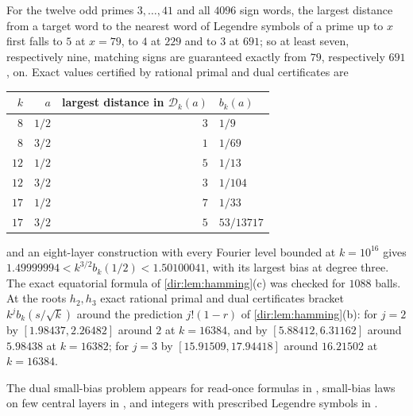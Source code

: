 \begin{example}\label{dir:ex:signs}
For the twelve odd primes $3,\dots,41$ and all $4096$ sign words, the largest distance from a
target word to the nearest word of Legendre symbols of a prime up to $x$ first falls to $5$ at
$x=79$, to $4$ at $229$ and to $3$ at $691$; so at least seven, respectively nine, matching signs
are guaranteed exactly from $79$, respectively $691$, on. Exact values certified by rational
primal and dual certificates are
\begin{center}\small
\begin{tabular}{rrrl}
\toprule
$k$ & $a$ & largest distance in $\mathcal D_k(a)$ & $b_k(a)$\\
\midrule
$8$ & $1/2$ & $3$ & $1/9$\\
$8$ & $3/2$ & $1$ & $1/69$\\
$12$ & $1/2$ & $5$ & $1/13$\\
$12$ & $3/2$ & $3$ & $1/104$\\
$17$ & $1/2$ & $7$ & $1/33$\\
$17$ & $3/2$ & $5$ & $53/13717$\\
\bottomrule
\end{tabular}
\end{center}
and an eight-layer construction with every Fourier level bounded at $k=10^{16}$ gives
$1.49999994<k^{3/2}b_k(1/2)<1.50100041$, with its largest bias at degree three. The exact
equatorial formula of \cref{dir:lem:hamming}(c) was checked for $1088$ balls. At the roots $h_2,h_3$
exact rational primal and dual certificates bracket $k^jb_k(s/\sqrt k)$ around the prediction
$j!(1-r)$ of \cref{dir:lem:hamming}(b): for $j=2$ by $[1.98437,2.26482]$ around $2$ at $k=16384$, and by
$[5.88412,6.31162]$ around $5.98438$ at $k=16382$; for $j=3$ by $[15.91509,17.94418]$ around $16.21502$
at $k=16384$.
\end{example}

The dual small-bias problem appears for read-once formulas in \cite{BazziNahas2013Small},
small-bias laws on few central layers in \cite{DerksenIvanovLeeViola2025Pseudorandomness}, and
integers with prescribed Legendre symbols in \cite{HansonVaughanZhang2016Least}.

